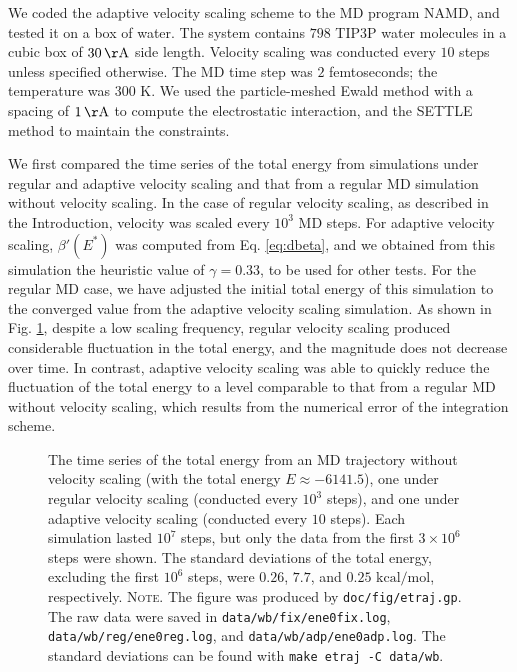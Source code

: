 \documentclass[preprint]{revtex4-1}
\newcommand{\note}[1]{{\color{DarkGreen}\footnotesize \textsc{Note.} #1}}
\begin{document}
We coded the adaptive velocity scaling scheme to
the MD program NAMD\cite{NAMD},
and tested it on a box of water.
%
The system contains
$798$ TIP3P water molecules\cite{jorgensen1983}
in a cubic box of $30 \, \mathrm{\AA}$ side length.
%
Velocity scaling was conducted every $10$ steps
unless specified otherwise.
%
The MD time step was $2$ femtoseconds;
the temperature was $300$ K.
%
We used the particle-meshed Ewald method\cite{essmann1995}
with a spacing of $1 \, \mathrm{\AA}$
to compute the electrostatic interaction,
and the SETTLE method\cite{miyamoto1992}
to maintain the constraints.


We first compared the time series of the total energy
from simulations
under regular and adaptive velocity scaling
and that from a regular MD simulation without velocity scaling.
%
In the case of regular velocity scaling,
as described in the Introduction,
velocity was scaled every $10^3$ MD steps.
%
For adaptive velocity scaling,
$\beta'(E^*)$ was computed from Eq. \eqref{eq:dbeta},
and we obtained from this simulation
the heuristic value of $\gamma = 0.33$,
to be used for other tests.
%
For the regular MD case,
we have adjusted the initial total energy of this simulation
to the converged value from the adaptive velocity scaling simulation.
%
As shown in Fig. \ref{fig:etraj},
despite a low scaling frequency,
regular velocity scaling
produced considerable fluctuation in the total energy,
and the magnitude does not decrease over time.
%
In contrast, adaptive velocity scaling
was able to quickly reduce the fluctuation of the total energy
to a level comparable to that
from a regular MD without velocity scaling,
which results from the numerical error of the integration scheme.

\begin{figure}[h]
\begin{center}
  \caption{
    \label{fig:etraj}
    The time series of the total energy
    from an MD trajectory
    without velocity scaling (with the total energy $E \approx -6141.5$),
    one under regular velocity scaling
    (conducted every $10^3$ steps),
    and
    one under adaptive velocity scaling (conducted every $10$ steps).
    Each simulation lasted $10^7$ steps,
    but only the data from the first $3\times 10^6$ steps were shown.
    The standard deviations of the total energy,
    excluding the first $10^6$ steps,
    were $0.26$, $7.7$, and $0.25$ $\mathrm{kcal/mol}$,
    respectively.
    \note{The figure was produced by \texttt{doc/fig/etraj.gp}.
      The raw data were saved in
      \texttt{data/wb/fix/ene0fix.log},
      \texttt{data/wb/reg/ene0reg.log},
      and
      \texttt{data/wb/adp/ene0adp.log}.
      The standard deviations can be found with
      \texttt{make etraj -C data/wb}.
    }%
  }
\end{center}
\end{figure}
\end{document}
